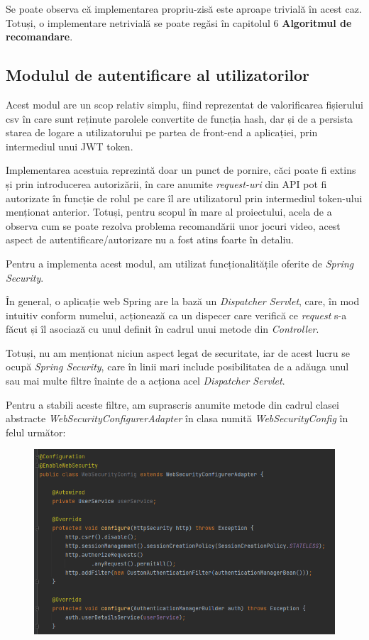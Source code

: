 \documentclass[12pt,a4paper]{report}
\begin{document}
Se poate observa că implementarea propriu-zisă este aproape trivială în acest caz. Totuși, o implementare netrivială se poate regăsi în capitolul 6 \textbf{Algoritmul de recomandare}.





\subsection{Modulul de autentificare al utilizatorilor}


   Acest modul are un scop relativ simplu, fiind reprezentat de valorificarea fișierului csv în care sunt reținute parolele convertite de funcția hash, dar și de a persista starea de logare a utilizatorului pe partea de front-end a aplicației, prin intermediul unui JWT token. \cite{24}

Implementarea acestuia reprezintă doar un punct de pornire, căci poate fi extins și prin introducerea autorizării, în care anumite \emph{request-uri} din API pot fi autorizate în funcție de rolul pe care îl are utilizatorul prin intermediul token-ului menționat anterior. Totuși, pentru scopul în mare al proiectului, acela de a observa cum se poate rezolva problema recomandării unor jocuri video, acest aspect de autentificare/autorizare nu a fost atins foarte în detaliu.

Pentru a implementa acest modul, am utilizat funcționalitățile oferite de \emph{Spring Security}. \cite{25}

În general, o aplicație web Spring are la bază un \emph{Dispatcher Servlet}, care, în mod intuitiv conform numelui, acționează ca un dispecer care verifică ce \emph{request} s-a făcut și îl asociază cu unul definit în cadrul unui metode din \emph{Controller}. \cite{26}

Totuși, nu am menționat niciun aspect legat de securitate, iar de acest lucru se ocupă \emph{Spring Security}, care în linii mari include posibilitatea de a adăuga unul sau mai multe filtre înainte de a acționa acel \emph{Dispatcher Servlet}.

Pentru a stabili aceste filtre, am suprascris anumite metode din cadrul clasei abstracte \emph{WebSecurityConfigurerAdapter} în clasa numită \emph{WebSecurityConfig} în felul următor:

\begin{figure}[H]
\centering
\caption{}
\includegraphics[scale = 0.7]{exemplu_23_security}
\caption*{}
\end{figure}
\end{document}
